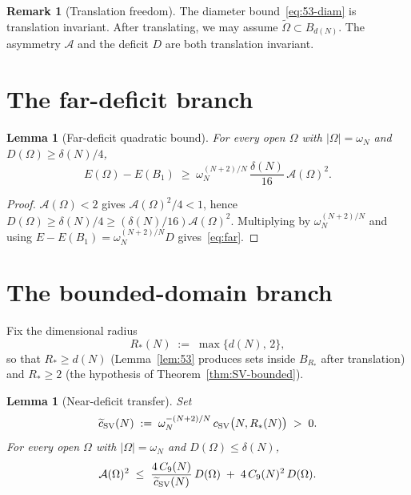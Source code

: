 \documentclass[11pt]{article}
\newtheorem{lemma}[theorem]{Lemma}
\theoremstyle{definition}
\newtheorem{remark}[theorem]{Remark}
\newcommand{\Fr}{\mathcal{A}}
\newcommand{\Om}{\Omega}
\newcommand{\Otilde}{\widetilde{\Omega}}
\begin{document}
\begin{remark}[Translation freedom]\label{rem:translation}
The diameter bound~\eqref{eq:53-diam} is translation invariant. After
translating, we may assume $\Otilde\subset B_{d(N)}$. The asymmetry
$\Fr$ and the deficit $D$ are both translation invariant.
\end{remark}

\section{The far-deficit branch}\label{sec:far}

\begin{lemma}[Far-deficit quadratic bound]\label{lem:far}
For every open $\Om$ with $|\Om|=\omega_{N}$ and
$D(\Om)\ge\delta(N)/4$,
\begin{equation}\label{eq:far}
   E(\Om)-E(B_{1})\;\ge\;\omega_{N}^{(N+2)/N}\,\frac{\delta(N)}{16}\,
   \Fr(\Om)^{2}.
\end{equation}
\end{lemma}

\begin{proof}
$\Fr(\Om)<2$ gives $\Fr(\Om)^{2}/4<1$, hence
$D(\Om)\ge\delta(N)/4\ge(\delta(N)/16)\Fr(\Om)^{2}$. Multiplying by
$\omega_{N}^{(N+2)/N}$ and using
$E-E(B_{1})=\omega_{N}^{(N+2)/N}D$ gives~\eqref{eq:far}.
\end{proof}

\section{The bounded-domain branch}\label{sec:near}

Fix the dimensional radius
\begin{equation}\label{eq:Rstar-def}
   R_{*}(N)\;:=\;\max\bigl\{d(N),\,2\bigr\},
\end{equation}
so that $R_{*}\ge d(N)$ (Lemma~\ref{lem:53} produces sets inside
$B_{R_{*}}$ after translation) and $R_{*}\ge 2$ (the hypothesis of
Theorem~\ref{thm:SV-bounded}).

\begin{lemma}[Near-deficit transfer]\label{lem:near}
Set
\begin{equation}\label{eq:csv-tilde-def}
   \widetilde c_{\rm SV}(N)
   \;:=\;\omega_{N}^{-(N+2)/N}\,c_{\rm SV}\bigl(N,R_{*}(N)\bigr)\;>\;0.
\end{equation}
For every open $\Om$ with $|\Om|=\omega_{N}$ and $D(\Om)\le\delta(N)$,
\begin{equation}\label{eq:near-Fr}
   \Fr(\Om)^{2}
   \;\le\;\frac{4\,C_{9}(N)}{\widetilde c_{\rm SV}(N)}\,D(\Om)
   \;+\;4\,C_{9}(N)^{2}\,D(\Om).
\end{equation}
\end{lemma}
\end{document}
